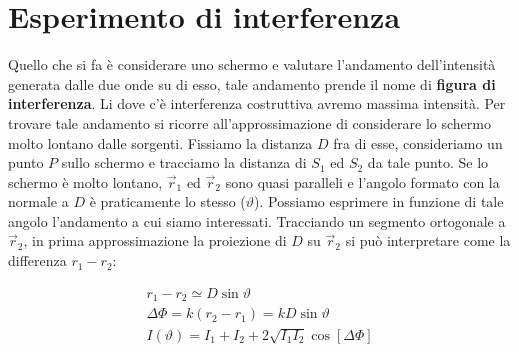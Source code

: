 \begin{figure}[htpb]
\end{figure}
\FloatBarrier

\section{Esperimento di interferenza}

Quello che si fa è considerare uno schermo e valutare l'andamento dell'intensità generata dalle due onde su di esso, tale andamento prende il nome di \textbf{figura di interferenza}. Li dove c'è interferenza costruttiva avremo massima intensità.
Per trovare tale andamento si ricorre all'approssimazione di considerare lo schermo molto lontano dalle sorgenti. Fissiamo la distanza $D$ fra di esse, consideriamo un punto $P$ sullo schermo e tracciamo la distanza di $S_1$ ed $S_2$ da tale punto. Se lo schermo è molto lontano, $\vec{r}_1$ ed $\vec{r}_2$ sono quasi paralleli e l'angolo formato con la normale a $D$ è praticamente lo stesso ($\vartheta$). Possiamo esprimere in funzione di tale angolo l'andamento a cui siamo interessati. Tracciando un segmento ortogonale a $\vec{r}_2$, in prima approssimazione la proiezione di $D$ su $\vec{r}_2$ si può interpretare come la differenza $r_1-r_2$:

\begin{gather*}
	r_1-r_2 \simeq D\sin \vartheta \\
	\Delta \Phi =k (r_2-r_1) = kD\sin \vartheta \\
	I(\vartheta) = I_1+I_2+2\sqrt{I_1I_2} \cos [\Delta \Phi ]
\end{gather*}

